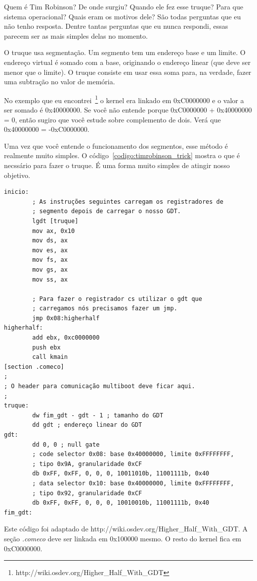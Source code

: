 \documentclass{article}
\begin{document}
Quem é Tim Robinson? De onde surgiu? Quando ele fez esse truque? Para que
sistema operacional? Quais eram os motivos dele? São todas perguntas que eu não
tenho resposta. Dentre tantas perguntas que eu nunca respondi, essas parecem ser
as mais simples delas no momento.

O truque usa segmentação. Um segmento tem um endereço base e um limite. O
endereço virtual é somado com a base, originando o endereço linear (que deve ser
menor que o limite). O truque consiste em usar essa soma para, na verdade, fazer
uma subtração no valor de memória.

No exemplo que eu
encontrei~\footnote{http://wiki.osdev.org/Higher\_Half\_With\_GDT} o kernel era
linkado em 0xC0000000 e o valor a ser somado é 0x40000000. Se você não entende
porque 0xC0000000 + 0x40000000 = 0, então sugiro que você estude sobre
complemento de dois. Verá que 0x40000000 = -0xC0000000.

Uma vez que você entende o funcionamento dos segmentos, esse método é realmente
muito simples. O código~\ref{codigo:timrobinson_trick} mostra o que é necssário
para fazer o truque. É uma forma muito simples de atingir nosso objetivo.

\begin{codigo}
\begin{verbatim}
inicio:
        ; As instruções seguintes carregam os registradores de
        ; segmento depois de carregar o nosso GDT.
        lgdt [truque]
        mov ax, 0x10
        mov ds, ax
        mov es, ax
        mov fs, ax
        mov gs, ax
        mov ss, ax

        ; Para fazer o registrador cs utilizar o gdt que
        ; carregamos nós precisamos fazer um jmp.
        jmp 0x08:higherhalf
higherhalf:
        add ebx, 0xc0000000
        push ebx
        call kmain
[section .comeco]
;
; O header para comunicação multiboot deve ficar aqui.
;
truque:
        dw fim_gdt - gdt - 1 ; tamanho do GDT
        dd gdt ; endereço linear do GDT
gdt:
        dd 0, 0 ; null gate
        ; code selector 0x08: base 0x40000000, limite 0xFFFFFFFF,
        ; tipo 0x9A, granularidade 0xCF
        db 0xFF, 0xFF, 0, 0, 0, 10011010b, 11001111b, 0x40
        ; data selector 0x10: base 0x40000000, limite 0xFFFFFFFF,
        ; tipo 0x92, granularidade 0xCF
        db 0xFF, 0xFF, 0, 0, 0, 10010010b, 11001111b, 0x40
fim_gdt:
\end{verbatim}
\caption{Este código foi adaptado de
http://wiki.osdev.org/Higher\_Half\_With\_GDT. A seção \emph{.comeco} deve ser
linkada em 0x100000 mesmo. O resto do kernel fica em 0xC0000000.}
\label{codigo:timrobinson_trick}
\end{codigo}
\end{document}
